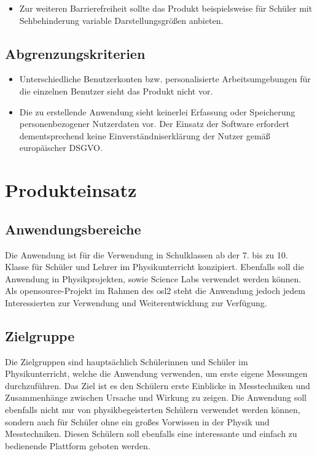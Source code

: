 \documentclass[parskip=full]{scrartcl}
\begin{document}
\begin{itemize}
	\item 
	\begin{WunschKrit} 
		Zur weiteren Barrierefreiheit sollte das Produkt beispielsweise für Schüler mit Sehbehinderung variable Darstellungsgrößen anbieten.
	\end{WunschKrit}
	
	
\end{itemize}



\subsection{Abgrenzungskriterien}

\begin{itemize}
	
	\item Unterschiedliche Benutzerkonten bzw. personalisierte Arbeitsumgebungen  für die einzelnen Benutzer sieht das Produkt nicht vor. 
	
	\item Die zu erstellende Anwendung sieht keinerlei Erfassung oder Speicherung personenbezogener Nutzerdaten vor. Der Einsatz der Software erfordert dementsprechend keine Einverständniserklärung der Nutzer gemäß europäischer \gls{DSGVO}.
	
\end{itemize}

\section{Produkteinsatz}\label{produkteinsatz}

\subsection{Anwendungsbereiche}

Die Anwendung ist für die Verwendung in Schulklassen ab der 7. bis zu 10. Klasse für Schüler und Lehrer im Physikunterricht konzipiert. Ebenfalls soll die Anwendung in Physikprojekten, sowie \gls{Science Labs} verwendet werden können. 
Als \gls{opensource}-Projekt im Rahmen des \gls{osl2} steht die Anwendung jedoch jedem Interessierten zur Verwendung und Weiterentwicklung zur Verfügung.


\subsection{Zielgruppe}

Die Zielgruppen sind hauptsächlich Schülerinnen und Schüler im Physikunterricht, welche die Anwendung verwenden, um erste eigene Messungen durchzuführen. Das Ziel ist es den Schülern erste Einblicke in Messtechniken und Zusammenhänge zwischen Ursache und Wirkung zu zeigen. 
Die Anwendung soll ebenfalls nicht nur von physikbegeisterten Schülern verwendet werden können, sondern auch für Schüler ohne ein großes Vorwissen in der Physik und Messtechniken. Diesen Schülern soll ebenfalls eine interessante und einfach zu bedienende Plattform geboten werden.
\end{document}
